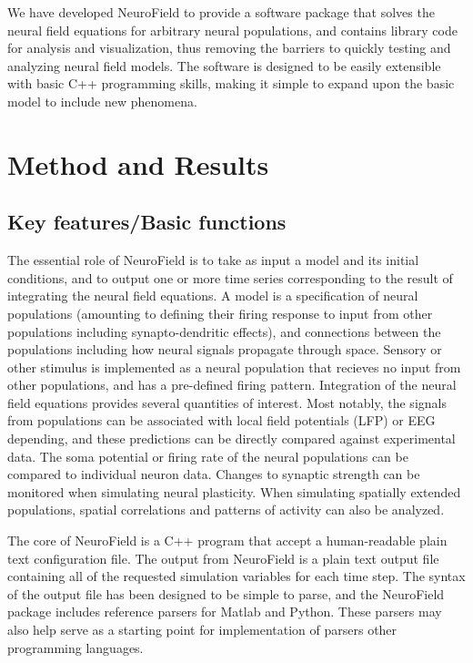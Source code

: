 \documentclass[preprint,review,10pt,authoryear,letterpaper]{elsarticle}
\begin{document}
We have developed NeuroField to provide a software package that solves the neural field equations for arbitrary neural populations, and contains library code for analysis and visualization, thus removing the barriers to quickly testing and analyzing neural field models. The software is designed to be easily extensible with basic C++ programming skills, making it simple to expand upon the basic model to include new phenomena. 

\section{Method and Results}
\label{sec:theory}

\subsection{Key features/Basic functions}
The essential role of NeuroField is to take as input a model and its initial conditions, and to output one or more time series corresponding to the result of integrating the neural field equations. A model is a specification of neural populations (amounting to defining their firing response to input from other populations including synapto-dendritic effects), and connections between the populations including how neural signals propagate through space. Sensory or other stimulus is implemented as a neural population that recieves no input from other populations, and has a pre-defined firing pattern. Integration of the neural field equations provides several quantities of interest. Most notably, the signals from populations can be associated with local field potentials (LFP) or EEG depending, and these predictions can be directly compared against experimental data. The soma potential or firing rate of the neural populations can be compared to individual neuron data. Changes to synaptic strength can be monitored when simulating neural plasticity. When simulating spatially extended populations, spatial correlations and patterns of activity can also be analyzed. 

The core of NeuroField is a C++ program that accept a human-readable plain text configuration file. The output from NeuroField is a plain text output file containing all of the requested simulation variables for each time step. The syntax of the output file has been designed to be simple to parse, and the NeuroField package includes reference parsers for Matlab and Python. These parsers may also help serve as a starting point for implementation of parsers other programming languages. 
\end{document}
